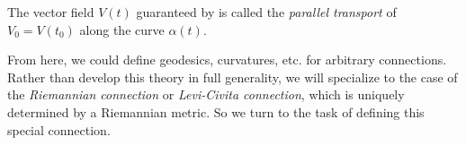 \begin{definition}\label{def:parallel transport}
	The vector field $V(t)$ guaranteed by  is called the \emph{parallel transport} of $V_0 = V(t_0)$ along the curve $\alpha(t)$.
\end{definition}

From here, we could define geodesics, curvatures, etc. for arbitrary connections. Rather than develop this theory in full generality, we will specialize to the case of the \emph{Riemannian connection} or \emph{Levi-Civita connection}, which is uniquely determined by a Riemannian metric. So we turn to the task of defining this special connection.